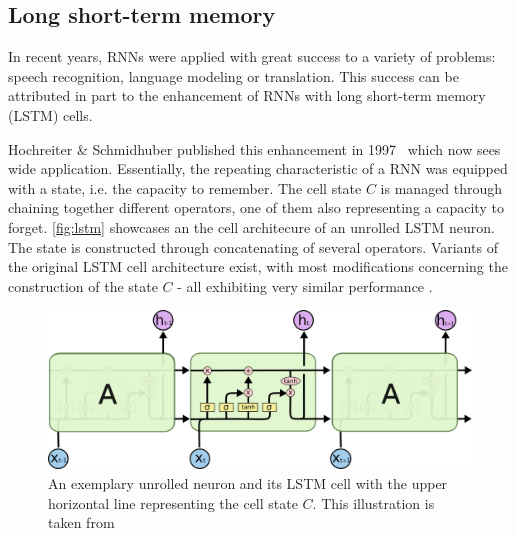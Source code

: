 \subsection{Long short-term memory}\label{sec:lstm}
In recent years, RNNs were applied with great success to a variety of problems: speech recognition, language modeling or translation. This success can be attributed in part to the enhancement of RNNs with long short-term memory (LSTM) cells.

Hochreiter \& Schmidhuber published this enhancement in 1997~\cite{hochreiter1997} which now sees wide application. Essentially, the repeating characteristic of a RNN was equipped with a state, i.e. the capacity to remember. The cell state $C$ is managed through chaining together different operators, one of them also representing a capacity to forget. \autoref{fig:lstm} showcases an the cell architecure of an unrolled LSTM neuron. The state is constructed through concatenating of several operators. Variants of the original LSTM cell architecture exist, with most modifications concerning the construction of the state $C$ - all exhibiting very similar performance \cite{greff2017lstm}.

\begin{figure}[ht!]
    \centering
    \includegraphics[width=.8\textwidth]{gfx/lstm-chain.png}
    \caption{An exemplary unrolled neuron and its LSTM cell with the upper horizontal line representing the cell state $C$. This illustration is taken from \cite{web:colah}}
    \label{fig:lstm}
\end{figure}

